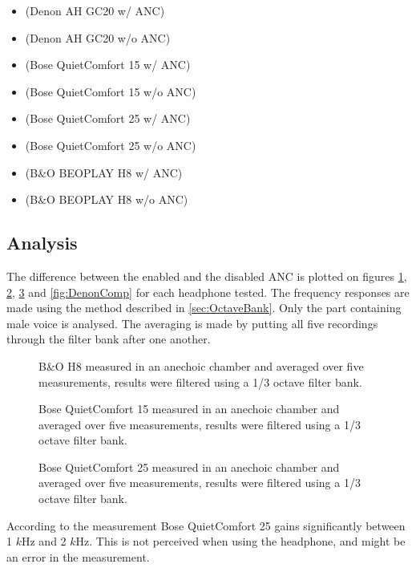 \begin{itemize}
	\item {}			(Denon AH GC20 w/ ANC)
	\item {}		(Denon AH GC20 w/o ANC)
	\item {}		(Bose QuietComfort 15 w/ ANC)
	\item {}		(Bose QuietComfort 15 w/o ANC)
	\item {}		(Bose QuietComfort 25 w/ ANC)
	\item {}		(Bose QuietComfort 25 w/o ANC)
	\item {}			(B\&O BEOPLAY H8 w/ ANC)
	\item {}			(B\&O BEOPLAY H8 w/o ANC)
\end{itemize}


\subsection{Analysis}
The difference between the enabled and the disabled ANC is plotted on figures \ref{fig:BOH8Comp}, \ref{fig:QC15Comp}, \ref{fig:QC25Comp} and \ref{fig:DenonComp} for each headphone tested.
 The frequency responses are made using the method described in \autoref{sec:OctaveBank}. Only the part containing male voice is analysed. The averaging is made by putting all five recordings through the filter bank after one another. 

\begin{figure}[H]
	\centering
	
	\caption{B\&O H8 measured in an anechoic chamber and averaged over five measurements, results were filtered using a 1/3 octave filter bank.}
	\label{fig:BOH8Comp}
\end{figure}

\begin{figure}[H]	
	\centering
	
	\caption{Bose QuietComfort 15 measured in an anechoic chamber and averaged over five measurements, results were filtered using a 1/3 octave filter bank.}
	\label{fig:QC15Comp}
\end{figure}

\begin{figure}[H]
	\centering
	
	\caption{Bose QuietComfort 25 measured in an anechoic chamber and averaged over five measurements, results were filtered using a 1/3 octave filter bank.}
	\label{fig:QC25Comp}
\end{figure}
According to the measurement Bose QuietComfort 25 gains significantly between 1 $k$Hz and 2 $k$Hz. This is not perceived when using the headphone, and might be an error in the measurement. 

